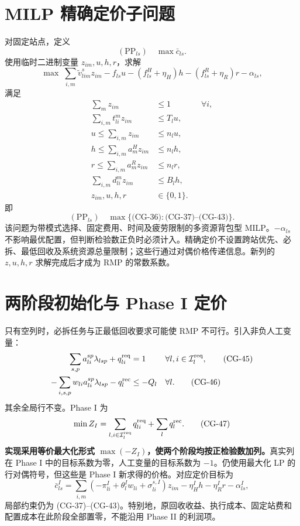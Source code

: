 \documentclass[UTF8,a4paper,11pt]{ctexart}
\newcommand{\cg}[1]{\tag{CG-#1}}
\begin{document}
\section{MILP 精确定价子问题}
对固定站点，定义
\begin{equation}(\mathrm{PP}_{ls})\quad\max\bar c_{ls}.\cg{35}\end{equation}
使用临时二进制变量 $z_{im},u,h,r$，求解
\begin{equation}
\max\;\sum_{i,m}\widetilde v_{lim}^{s}z_{im}-f_{ls}u
-(f_{ls}^H+\eta_H)h-(f_{ls}^R+\eta_R)r-\alpha_{ls},\cg{36}
\end{equation}
满足
\begin{align}
\sum_mz_{im}&\leq1 &&\forall i,\cg{37}\\
\sum_{i,m}t_{li}^mz_{im}&\leq T_lu,\cg{38}\\
u\leq\sum_{i,m}z_{im}&\leq n_lu,\cg{39}\\
h\leq\sum_{i,m}a_m^Hz_{im}&\leq n_lh,\cg{40}\\
r\leq\sum_{i,m}a_m^Rz_{im}&\leq n_lr,\cg{41}\\
\sum_{i,m}d_{li}^mz_{im}&\leq B_lh,\cg{42}\\
z_{im},u,h,r&\in\{0,1\}.\cg{43}
\end{align}
即
\begin{equation}
(\mathrm{PP}_{ls})\quad\max\{\text{(CG-36)}:\text{(CG-37)--(CG-43)}\}.\cg{44}
\end{equation}
该问题为带模式选择、固定费用、时间及疲劳限制的多资源背包型 MILP。$-\alpha_{ls}$ 不影响最优配置，但判断检验数正负时必须计入。精确定价不设置跨站优先、必拆、最低回收及系统资源总量限制；这些行通过对偶价格传递信息。新列的 $z,u,h,r$ 求解完成后才成为 RMP 的常数系数。

\section{两阶段初始化与 Phase I 定价}
只有空列时，必拆任务与正最低回收要求可能使 RMP 不可行。引入非负人工变量：
\begin{align}
\sum_{s,p}a_{li}^{sp}\lambda_{lsp}+q_{li}^{\rm req}&=1
&&\forall l,i\in\mathcal I_l^{\rm req},\cg{45}\\
-\sum_{i,s,p}w_{li}a_{li}^{sp}\lambda_{lsp}-q_l^{\rm rec}&\leq-Q_l
&&\forall l.\cg{46}
\end{align}
其余全局行不变。Phase I 为
\begin{equation}\min Z_I=\sum_{l,i\in\mathcal I_l^{\rm req}}q_{li}^{\rm req}+\sum_lq_l^{\rm rec}.\cg{47}\end{equation}
\textbf{实现采用等价最大化形式 $\max(-Z_I)$，使两个阶段均按正检验数加列。}真实列在 Phase I 中的目标系数为零，人工变量的目标系数为 $-1$。仍使用最大化 LP 的行对偶符号，但这些是 Phase I 新求得的价格。对应定价目标为
\[
\bar c^I_{ls}=\sum_{i,m}(-\pi^I_{li}+\theta_l^Iw_{li}+\sigma_{li}^{s,I})z_{im}
-\eta_H^Ih-\eta_R^Ir-\alpha_{ls}^I,
\]
局部约束仍为 (CG-37)--(CG-43)。特别地，原回收收益、执行成本、固定站费和配置成本在此阶段全部置零，不能沿用 Phase II 的利润项。
\end{document}
